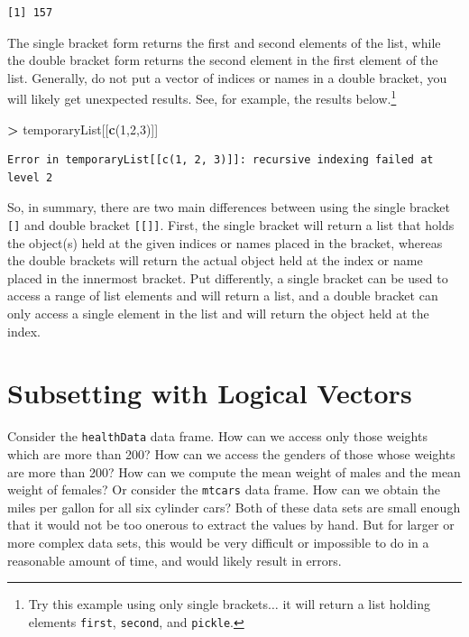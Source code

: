 \documentclass[
]{krantz}
\makeatletter
\newenvironment{Shaded}{\begin{snugshade}}{\end{snugshade}}
\newcommand{\DecValTok}[1]{\textcolor[rgb]{0.06,0.06,0.06}{#1}}
\newcommand{\KeywordTok}[1]{\textcolor[rgb]{0.27,0.27,0.27}{\textbf{#1}}}
\newcommand{\NormalTok}[1]{#1}
\newcommand{\OperatorTok}[1]{\textcolor[rgb]{0.43,0.43,0.43}{\textbf{#1}}}
\newcommand{\StringTok}[1]{\textcolor[rgb]{0.5,0.5,0.5}{#1}}
\newenvironment{kframe}{%
\medskip{}
\setlength{\fboxsep}{.8em}
 \def\at@end@of@kframe{}%
 \ifinner\ifhmode%
  \def\at@end@of@kframe{\end{minipage}}%
  \begin{minipage}{\columnwidth}%
 \fi\fi%
 \def\FrameCommand##1{\hskip\@totalleftmargin \hskip-\fboxsep
 \colorbox{shadecolor}{##1}\hskip-\fboxsep
     \hskip-\linewidth \hskip-\@totalleftmargin \hskip\columnwidth}%
 \MakeFramed {\advance\hsize-\width
   \@totalleftmargin\z@ \linewidth\hsize
   \@setminipage}}%
 {\par\unskip\endMakeFramed%
 \at@end@of@kframe}
\renewenvironment{Shaded}{\begin{kframe}}{\end{kframe}}
\makeatother
\begin{document}
\begin{verbatim}
[1] 157
\end{verbatim}

The single bracket form returns the first and second elements of the list, while the double bracket form returns the second element in the first element of the list. Generally, do not put a vector of indices or names in a double bracket, you will likely get unexpected results. See, for example, the results below.\footnote{Try this example using only single brackets\(\ldots\) it will return a list holding elements \texttt{first}, \texttt{second}, and \texttt{pickle}.}

\begin{Shaded}
\begin{Highlighting}[]
\OperatorTok{\textgreater{}}\StringTok{ }\NormalTok{temporaryList[[}\KeywordTok{c}\NormalTok{(}\DecValTok{1}\NormalTok{,}\DecValTok{2}\NormalTok{,}\DecValTok{3}\NormalTok{)]]}
\end{Highlighting}
\end{Shaded}

\begin{verbatim}
Error in temporaryList[[c(1, 2, 3)]]: recursive indexing failed at level 2
\end{verbatim}

So, in summary, there are two main differences between using the single bracket \texttt{{[}{]}} and double bracket \texttt{{[}{[}{]}{]}}. First, the single bracket will return a list that holds the object(s) held at the given indices or names placed in the bracket, whereas the double brackets will return the actual object held at the index or name placed in the innermost bracket. Put differently, a single bracket can be used to access a range of list elements and will return a list, and a double bracket can only access a single element in the list and will return the object held at the index.

\hypertarget{subsetting}{%
\section{Subsetting with Logical Vectors}\label{subsetting}}

Consider the \texttt{healthData} data frame. How can we access only those weights which are more than 200? How can we access the genders of those whose weights are more than 200? How can we compute the mean weight of males and the mean weight of females? Or consider the \texttt{mtcars} data frame. How can we obtain the miles per gallon for all six cylinder cars? Both of these data sets are small enough that it would not be too onerous to extract the values by hand. But for larger or more complex data sets, this would be very difficult or impossible to do in a reasonable amount of time, and would likely result in errors.
\end{document}
